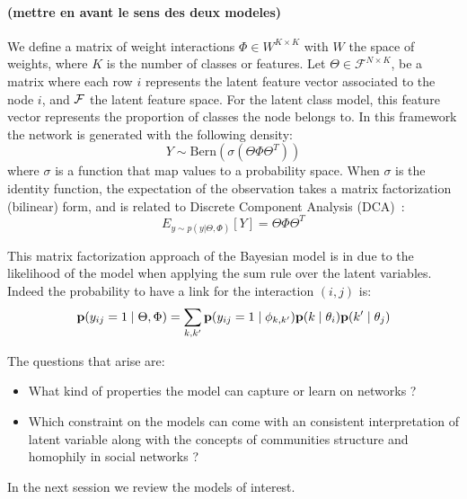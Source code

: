 \paragraph{(mettre en avant le sens des deux modeles)}
We define a matrix of weight interactions $\Phi \in W^{K\times K}$ with $W$ the space of weights, where $K$ is the number of classes or features. Let $\Theta \in \mathcal{F}^{N\times K}$, be a matrix where each row $i$ represents the latent feature vector associated to the node $i$,  and $\cal{F}$ the latent feature space. For the latent class model, this feature vector represents the proportion of classes the node belongs to. In this framework the network is generated with the following density:
\begin{equation} \label{MFDCA}
    Y \sim \mathrm{Bern}(\sigma(\Theta \Phi  \Theta^T))
\end{equation}
where $\sigma$ is a function that map values to a probability space. When $\sigma$ is the identity function, the expectation of the observation takes a matrix factorization (bilinear) form, and is related to Discrete Component Analysis (DCA)~\cite{DCA}:
\begin{equation}
E_{y \sim p(y|\Theta, \Phi)}[Y] = \Theta \Phi  \Theta^T
\end{equation}

This matrix factorization approach of the Bayesian model is in due to the likelihood of the model when applying the sum rule over the latent variables. Indeed the probability to have a link for the interaction $(i,j)$ is:
\begin{equation}
\mathbf{p}(y_{ij}=1 \mid \Theta, \Phi ) = \sum_{k, k'} \mathbf{p}(y_{ij}=1\mid\phi_{k,k'}) \mathbf{p}(k \mid\theta_i) \mathbf{p}(k' \mid \theta_j)
\end{equation}


The questions that arise are:
\begin{itemize}
	\item What kind of properties the model can capture or learn on networks ?
	\item Which constraint on the models can come with an consistent interpretation of latent variable along with the concepts of communities structure and homophily in social networks  ?
\end{itemize} 

In the next session we review the models of interest.

